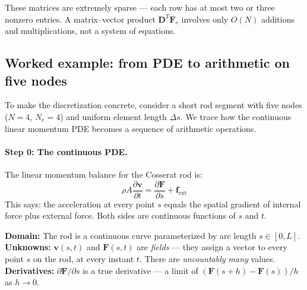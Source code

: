 \documentclass[11pt]{article}
\newcommand{\vect}[1]{\mathbf{#1}}
\newcommand{\mat}[1]{\mathbf{#1}}
\newcommand{\ddt}[1]{\frac{\partial #1}{\partial t}}
\newcommand{\dds}[1]{\frac{\partial #1}{\partial s}}
\begin{document}
\noindent
These matrices are extremely sparse --- each row has at most two or three nonzero entries.
A matrix--vector product $\mat{D}^T \vect{F}_e$ involves only $O(N)$ additions and multiplications, not a system of equations.

\subsection{Worked example: from PDE to arithmetic on five nodes}

To make the discretization concrete, consider a short rod segment with five nodes ($N = 4$, $N_e = 4$) and uniform element length $\Delta s$.
We trace how the continuous linear momentum PDE becomes a sequence of arithmetic operations.

\paragraph{Step 0: The continuous PDE.}
The linear momentum balance for the Cosserat rod is:
\begin{equation}
  \rho A \ddt{\vect{v}} = \dds{\vect{F}} + \vect{f}_{\text{ext}}
  \label{eq:pde-momentum}
\end{equation}
This says: the acceleration at every point $s$ equals the spatial gradient of internal force plus external force.
Both sides are continuous functions of $s$ and $t$.

\begin{tcolorbox}[colback=blue!3, colframe=blue!30, title={\small Step 0 --- What we have}, fonttitle=\bfseries\small]
\begin{minipage}[t]{0.55\linewidth}
\textbf{Domain:} The rod is a continuous curve parameterized by arc length $s \in [0, L]$.\\[2pt]
\textbf{Unknowns:} $\vect{v}(s, t)$ and $\vect{F}(s, t)$ are \emph{fields} --- they assign a vector to every point $s$ on the rod, at every instant $t$.
There are \emph{uncountably many} values.\\[2pt]
\textbf{Derivatives:} $\partial \vect{F}/\partial s$ is a true derivative --- a limit of $(\vect{F}(s+h) - \vect{F}(s))/h$ as $h \to 0$.
\end{minipage}\hfill
\begin{minipage}[t]{0.4\linewidth}
\centering
{}
\end{minipage}
\end{tcolorbox}
\end{document}
